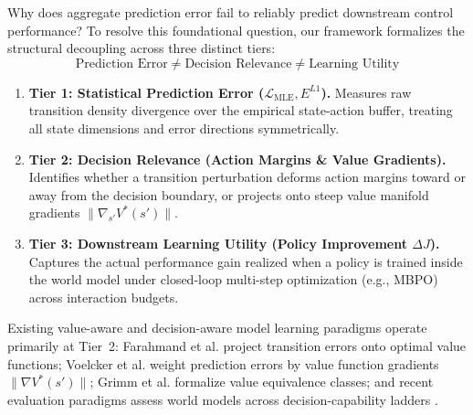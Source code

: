 \documentclass[journal,10pt,twocolumn]{IEEEtran}
\begin{document}
Why does aggregate prediction error fail to reliably predict downstream control performance? 
To resolve this foundational question, our framework formalizes the structural decoupling across three distinct tiers:
\begin{equation}
\boxed{\text{Prediction Error} \neq \text{Decision Relevance} \neq \text{Learning Utility}}
\label{eq:three_tier_decoupling}
\end{equation}
\begin{enumerate}
    \item \textbf{Tier 1: Statistical Prediction Error ($\mathcal{L}_{\mathrm{MLE}}, E^{L1}$).} Measures raw transition density divergence over the empirical state-action buffer, treating all state dimensions and error directions symmetrically.
    \item \textbf{Tier 2: Decision Relevance (Action Margins \& Value Gradients).} Identifies whether a transition perturbation deforms action margins toward or away from the decision boundary, or projects onto steep value manifold gradients $\|\nabla_{s'} V^*(s')\|$.
    \item \textbf{Tier 3: Downstream Learning Utility (Policy Improvement $\Delta J$).} Captures the actual performance gain realized when a policy is trained inside the world model under closed-loop multi-step optimization (e.g., MBPO) across interaction budgets.
\end{enumerate}

Existing value-aware and decision-aware model learning paradigms \cite{farahmand2017value, voelcker2022value, grimm2020value, modhe2021model, voelcker2023lambda, voelcker2025calibrated, qiao2026model} operate primarily at Tier~2: Farahmand et al. \cite{farahmand2017value} project transition errors onto optimal value functions; Voelcker et al. \cite{voelcker2022value} weight prediction errors by value function gradients $\|\nabla V^*(s')\|$; Grimm et al. \cite{grimm2020value, grimm2021proper} formalize value equivalence classes; and recent evaluation paradigms assess world models across decision-capability ladders \cite{yu2026worldmodelsevaluatedembodied, ghosh2026actionshapleytrainingdata, an2026diagnosing, causalnav2026}.
\end{document}

